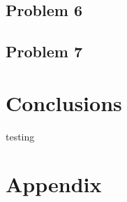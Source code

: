 \documentclass[a4paper]{article}
\begin{document}
\subsection{Problem 6}
\lipsum[1]
\subsection{Problem 7}
\lipsum[1]

\section{Conclusions} \label{Conclusions}
testing \cite{book}

\section{Appendix}
\lipsum[1]




\end{document}
